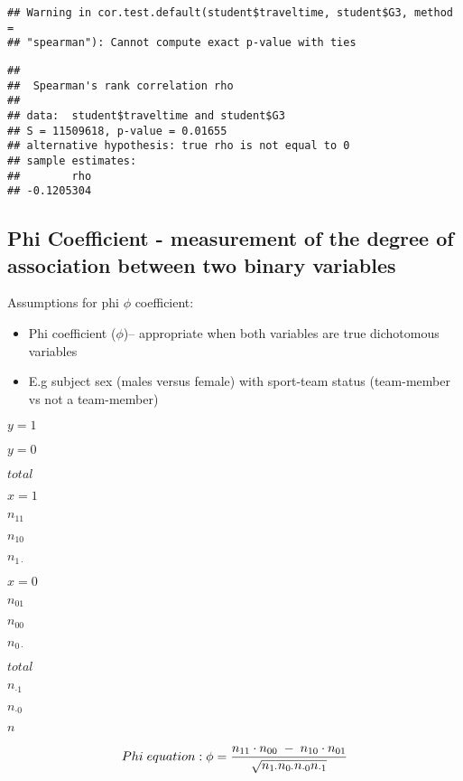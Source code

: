 \documentclass[
]{book}
\theoremstyle{definition}
\theoremstyle{definition}
\theoremstyle{definition}
\theoremstyle{definition}
\theoremstyle{remark}
\begin{document}
\begin{verbatim}
## Warning in cor.test.default(student$traveltime, student$G3, method =
## "spearman"): Cannot compute exact p-value with ties
\end{verbatim}

\begin{verbatim}
## 
##  Spearman's rank correlation rho
## 
## data:  student$traveltime and student$G3
## S = 11509618, p-value = 0.01655
## alternative hypothesis: true rho is not equal to 0
## sample estimates:
##        rho 
## -0.1205304
\end{verbatim}

\hypertarget{phi-coefficient---measurement-of-the-degree-of-association-between-two-binary-variables}{%
\subsection{Phi Coefficient - measurement of the degree of association between two binary variables}\label{phi-coefficient---measurement-of-the-degree-of-association-between-two-binary-variables}}

Assumptions for phi \(\phi\) coefficient:

\begin{itemize}
\item
  Phi coefficient (\(\phi\))-- appropriate when both variables are true dichotomous variables
\item
  E.g subject sex (males versus female) with sport-team status (team-member vs not a team-member)
\end{itemize}

\(y=1\)

\(y=0\)

\(total\)

\(x=1\)

\(n_{11}\)

\(n_{10}\)

\medium\(n_{1\cdot}\)

\(x=0\)

\(n_{01}\)

\(n_{00}\)

\medium\(n_{0\cdot}\)

\(total\)

\medium\(n_{\cdot1}\)

\medium\(n_{\cdot0}\)

\(n\)

\[\Large Phi\;equation: 
\phi = \frac{n_{11} \cdot n_{00}\;-\;n_{10} \cdot n_{01}}{\sqrt{n_{1\cdot}n_{0\cdot} n_{\cdot0} n_{\cdot1}} }\]
\end{document}
